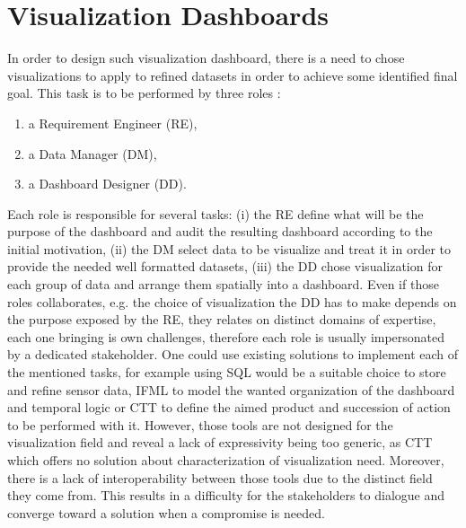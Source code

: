 \documentclass{acm_proc_article-sp}
\begin{document}
\section{Visualization Dashboards}
In order to design such visualization dashboard, there is a need to chose
visualizations to apply to refined datasets in order to achieve some
identified final goal. This task is to be performed by three roles :
\begin{enumerate}
\item a Requirement Engineer (RE),
\item a Data Manager (DM),
\item  a Dashboard Designer (DD).
\end{enumerate}
Each role is responsible for several tasks:
(i) the RE define what will be the purpose of the dashboard and audit the
resulting dashboard according to the initial motivation,
(ii) the DM select data to be visualize and treat it in order to provide
the needed well formatted datasets,
(iii) the DD chose visualization for each group of data and arrange them
spatially into a dashboard.
Even if those roles collaborates, e.g. the choice of visualization the DD has to make depends on the purpose exposed by the RE, they relates on distinct domains of expertise, each one bringing is own challenges, therefore each role is usually impersonated by a dedicated stakeholder.
One could use existing solutions to implement each of the mentioned tasks, for
example using SQL would be a suitable choice to store and refine
sensor data, IFML to model the wanted organization of the dashboard
and temporal logic or CTT to define the aimed product and succession of action
to be performed with it.
However, those tools are not designed for the visualization field and reveal a
lack of expressivity being too generic, as CTT which offers no solution about
characterization of visualization need.
Moreover, there is a lack of interoperability between those tools due to the distinct field they come from. This results in a difficulty for the stakeholders to dialogue and converge toward a solution when a compromise is needed.
\end{document}
